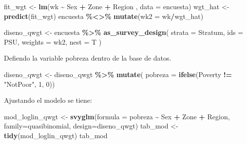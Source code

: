 \documentclass[
  spanish,
  12pt,
]{book}
\newenvironment{Shaded}{\begin{snugshade}}{\end{snugshade}}
\newcommand{\AttributeTok}[1]{\textcolor[rgb]{0.13,0.29,0.53}{#1}}
\newcommand{\DecValTok}[1]{\textcolor[rgb]{0.00,0.00,0.81}{#1}}
\newcommand{\FunctionTok}[1]{\textcolor[rgb]{0.13,0.29,0.53}{\textbf{#1}}}
\newcommand{\NormalTok}[1]{#1}
\newcommand{\OtherTok}[1]{\textcolor[rgb]{0.56,0.35,0.01}{#1}}
\newcommand{\SpecialCharTok}[1]{\textcolor[rgb]{0.81,0.36,0.00}{\textbf{#1}}}
\newcommand{\StringTok}[1]{\textcolor[rgb]{0.31,0.60,0.02}{#1}}
\begin{document}
\begin{Shaded}
\begin{Highlighting}[]
\NormalTok{  fit\_wgt }\OtherTok{\textless{}{-}} \FunctionTok{lm}\NormalTok{(wk }\SpecialCharTok{\textasciitilde{}}\NormalTok{  Sex }\SpecialCharTok{+}\NormalTok{ Zone }\SpecialCharTok{+}\NormalTok{ Region ,}
                \AttributeTok{data =}\NormalTok{ encuesta)}
\NormalTok{  wgt\_hat }\OtherTok{\textless{}{-}} \FunctionTok{predict}\NormalTok{(fit\_wgt)}
\NormalTok{  encuesta }\SpecialCharTok{\%\textless{}\textgreater{}\%} \FunctionTok{mutate}\NormalTok{(}\AttributeTok{wk2 =}\NormalTok{ wk}\SpecialCharTok{/}\NormalTok{wgt\_hat)}
  
\NormalTok{  diseno\_qwgt }\OtherTok{\textless{}{-}}\NormalTok{ encuesta }\SpecialCharTok{\%\textgreater{}\%}
    \FunctionTok{as\_survey\_design}\NormalTok{(}
      \AttributeTok{strata =}\NormalTok{ Stratum,}
      \AttributeTok{ids =}\NormalTok{ PSU,}
      \AttributeTok{weights =}\NormalTok{ wk2,}
      \AttributeTok{nest =}\NormalTok{ T}
\NormalTok{    )}
\end{Highlighting}
\end{Shaded}

Defiendo la variable pobreza dentro de la base de datos.

\begin{Shaded}
\begin{Highlighting}[]
\NormalTok{diseno\_qwgt }\OtherTok{\textless{}{-}}\NormalTok{ diseno\_qwgt }\SpecialCharTok{\%\textgreater{}\%} \FunctionTok{mutate}\NormalTok{(}
\AttributeTok{pobreza =} \FunctionTok{ifelse}\NormalTok{(Poverty }\SpecialCharTok{!=} \StringTok{"NotPoor"}\NormalTok{, }\DecValTok{1}\NormalTok{, }\DecValTok{0}\NormalTok{))}
\end{Highlighting}
\end{Shaded}

Ajustando el modelo se tiene:

\begin{Shaded}
\begin{Highlighting}[]
\NormalTok{mod\_loglin\_qwgt }\OtherTok{\textless{}{-}} \FunctionTok{svyglm}\NormalTok{(}\AttributeTok{formula =}\NormalTok{ pobreza }\SpecialCharTok{\textasciitilde{}}\NormalTok{ Sex }\SpecialCharTok{+}\NormalTok{ Zone }\SpecialCharTok{+}\NormalTok{ Region,}
                          \AttributeTok{family=}\NormalTok{quasibinomial,}
                          \AttributeTok{design=}\NormalTok{diseno\_qwgt)}
\NormalTok{tab\_mod }\OtherTok{\textless{}{-}} \FunctionTok{tidy}\NormalTok{(mod\_loglin\_qwgt)}
\NormalTok{tab\_mod}
\end{Highlighting}
\end{Shaded}
\end{document}
